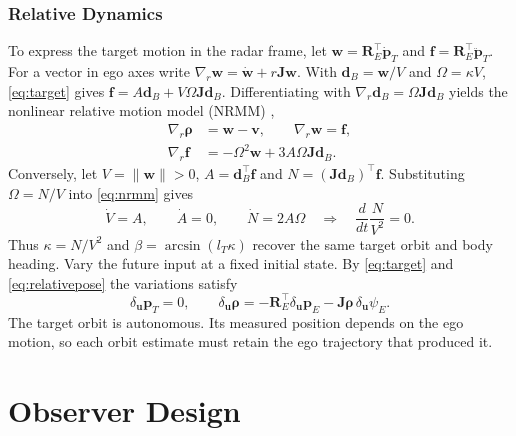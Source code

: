 \documentclass[journal]{IEEEtran}
\theoremstyle{definition}
\newcommand{\vct}[1]{\boldsymbol{#1}}
\newcommand{\mtx}[1]{\mathbf{#1}}
\begin{document}
\subsubsection{Relative Dynamics}
To express the target motion in the radar frame, let
$\vct w=\mtx R_E^\top\dot{\vct p}_T$ and
$\vct f=\mtx R_E^\top\ddot{\vct p}_T$. For a vector in ego axes
write $\nabla_r\vct w=\dot{\vct w}+r\mtx J\vct w$. With
$\vct d_B=\vct w/V$ and $\Omega=\kappa V$, \eqref{eq:target} gives
$\vct f=A\vct d_B+V\Omega\mtx J\vct d_B$.
Differentiating with $\nabla_r\vct d_B=\Omega\mtx J\vct d_B$ yields
the nonlinear relative motion model (NRMM) \cite{SharmaAlaiRajamani2026},
\begin{equation}\label{eq:nrmm}
\begin{aligned}
 \nabla_r\vct\rho&=\vct w-\vct v,\qquad \nabla_r\vct w=\vct f,\\
 \nabla_r\vct f&=-\Omega^2\vct w+3A\Omega\mtx J\vct d_B .
\end{aligned}
\end{equation}
Conversely, let $V=\|\vct w\|>0$, $A=\vct d_B^\top\vct f$ and
$N=(\mtx J\vct d_B)^\top\vct f$. Substituting $\Omega=N/V$ into
\eqref{eq:nrmm} gives
\begin{equation*}
 \dot V=A,\qquad \dot A=0,\qquad
 \dot N=2A\Omega
 \quad\Longrightarrow\quad \frac{d}{dt}\frac{N}{V^2}=0 .
\end{equation*}
Thus $\kappa=N/V^2$ and $\beta=\arcsin(l_T\kappa)$ recover the same
target orbit and body heading. Vary the future input at a fixed initial
state. By \eqref{eq:target} and \eqref{eq:relativepose} the variations satisfy
\begin{equation*}
 \delta_{\vct u}\vct p_T=0,\qquad
 \delta_{\vct u}\vct\rho=-\mtx R_E^\top\delta_{\vct u}\vct p_E
                  -\mtx J\vct\rho\,\delta_{\vct u}\psi_E .
\end{equation*}
The target orbit is autonomous. Its measured position depends on the
ego motion, so each orbit estimate must retain the ego trajectory that
produced it.

\section{Observer Design}\label{sec:estimator}
\end{document}
